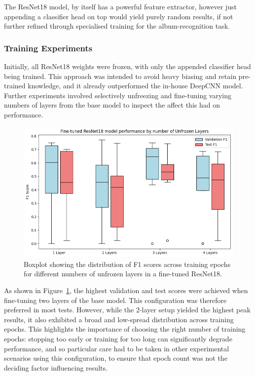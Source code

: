                 The ResNet18 model, by itself has a powerful feature extractor, however just appending a classifier head on top would yield purely random results, if not further refined through specialised training for the album-recognition task.
    
                \subsubsection{Training Experiments}
    
                    Initially, all ResNet18 weights were frozen, with only the appended classifier head being trained. This approach was intended to avoid heavy biasing and retain pre-trained knowledge, and it already outperformed the in-house DeepCNN model. Further experiments involved selectively unfreezing and fine-tuning varying numbers of layers from the base model to inspect the affect this had on performance.
    
                    \begin{figure}
                        \centering
                        \includegraphics[width=\textwidth]{images/ResNetLayerTests.png}
                        \caption{Boxplot showing the distribution of F1 scores across training epochs for different numbers of unfrozen layers in a fine-tuned ResNet18.} \label{fig:ResNetLayers}
                    \end{figure}
                    
                    As shown in Figure~\ref{fig:ResNetLayers}, the highest validation and test scores were achieved when fine-tuning two layers of the base model. This configuration was therefore preferred in most tests. However, while the 2-layer setup yielded the highest peak results, it also exhibited a broad and low-spread distribution across training epochs. This highlights the importance of choosing the right number of training epochs: stopping too early or training for too long can significantly degrade performance, and so particular care had to be taken in other experimental scenarios using this configuration, to ensure that epoch count was not the deciding factor influencing results.
        
